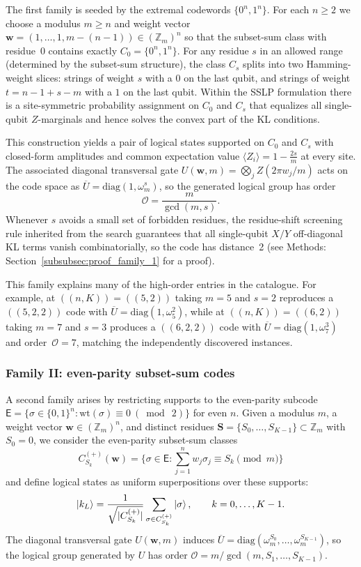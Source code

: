 \documentclass[pdflatex,sn-nature]{sn-jnl}%
\theoremstyle{thmstyleone}%
\theoremstyle{thmstyletwo}%
\theoremstyle{thmstylethree}%
\begin{document}
The first family is seeded by the extremal codewords $\{0^n,1^n\}$. For each $n\ge2$ we choose a modulus $m\ge n$ and weight vector
$\mathbf w=(1,\dots,1,m-(n-1))\in(\mathbb Z_m)^n$ so that the subset-sum class with residue~$0$ contains exactly
$C_0=\{0^n,1^n\}$. For any residue $s$ in an allowed range (determined by the subset-sum structure), the class $C_s$ splits into two Hamming-weight slices: strings of weight $s$ with a $0$ on the last qubit, and strings of weight $t=n-1+s-m$ with a $1$ on the last qubit. Within the SSLP formulation there is a site-symmetric probability assignment on $C_0$ and $C_s$ that equalizes all single-qubit $Z$-marginals and hence solves the convex part of the KL conditions.

This construction yields a pair of logical states supported on $C_0$ and $C_s$ with closed-form amplitudes and common expectation value $\langle Z_i\rangle=1-\tfrac{2s}{m}$ at every site. The associated diagonal transversal gate
$U(\mathbf w,m)=\bigotimes_j Z(2\pi w_j/m)$ acts on the code space as
$\overline U=\mathrm{diag}(1,\omega_m^{s})$, so the generated logical group has order
\[
  \mathcal O=\frac{m}{\gcd(m,s)} .
\]
Whenever $s$ avoids a small set of forbidden residues, the residue-shift screening rule inherited from the search guarantees that all single-qubit $X/Y$ off-diagonal KL terms vanish combinatorially, so the code has distance~2 (see Methods: Section~\ref{subsubsec:proof_family_1} for a proof).

This family explains many of the high-order entries in the catalogue. For example, at $((n,K))=((5,2))$ taking $m=5$ and $s=2$ reproduces a $((5,2,2))$ code with $\overline U=\mathrm{diag}(1,\omega_5^2)$, while at $((n,K))=((6,2))$ taking $m=7$ and $s=3$ produces a $((6,2,2))$ code with $\overline U=\mathrm{diag}(1,\omega_7^3)$ and order~$\mathcal O=7$, matching the independently discovered instances.


\subsubsection{Family II: even-parity subset-sum codes}
\label{subsubsec:family2}

A second family arises by restricting supports to the even-parity subcode
$\mathsf E=\{\sigma\in\{0,1\}^n:\mathrm{wt}(\sigma)\equiv 0\ (\bmod\ 2)\}$ for even $n$. Given a modulus $m$, a weight vector $\mathbf w\in(\mathbb Z_m)^n$, and distinct residues $\mathbf S=\{S_0,\dots,S_{K-1}\}\subset\mathbb Z_m$ with $S_0=0$, we consider the even-parity subset-sum classes
\[
  C^{(+)}_{S_k}(\mathbf w)=\bigl\{\sigma\in\mathsf E:\textstyle\sum_{j=1}^{n} w_j\sigma_j\equiv S_k \pmod m\bigr\}
\]
and define logical states as uniform superpositions over these supports:
\[
    \ket{k_L} = \frac{1}{\sqrt{|C^{(+)}_{S_k}|}}\sum_{\sigma\in C^{(+)}_{S_k}}\ket{\sigma},\qquad k=0,\dots,K-1.
\]
The diagonal transversal gate $U(\mathbf w,m)$ induces $\overline U=\mathrm{diag}(\omega_m^{S_0},\dots,\omega_m^{S_{K-1}})$, so the logical group generated by $U$ has order $\mathcal O = m / \gcd(m,S_1,\dots,S_{K-1})$.
\end{document}
